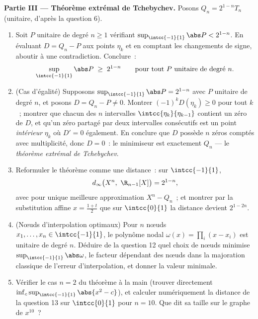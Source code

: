 \begin{problem}
\medskip
\noindent\textbf{Partie III --- Théorème extrémal de Tchebychev.}
Posons $Q_n = 2^{1-n}T_n$ (unitaire, d'après la question 6).
\begin{enumerate}[resume]
  \item Soit $P$ unitaire de degré $n \geq 1$ vérifiant $\sup_{\intcc{-1}{1}}\abs P < 2^{1-n}$. En évaluant $D
        = Q_n - P$ aux points $\eta_k$ et en comptant les
        changements de signe, aboutir à une contradiction. Conclure~:
        \[
        \sup_{\intcc{-1}{1}}\abs P \;\geq\; 2^{1-n}
        \qquad\text{pour tout } P \text{ unitaire de degré } n.
        \]
  \item (Cas d'égalité) Supposons $\sup_{\intcc{-1}{1}}\abs P =
        2^{1-n}$ avec $P$ unitaire de degré $n$, et posons $D = Q_n
        - P \neq 0$. Montrer $(-1)^kD(\eta_k) \geq 0$ pour tout $k$~;
        montrer que chacun des $n$ intervalles
        $\intcc{\eta_{k}}{\eta_{k-1}}$ contient un zéro de $D$,
        et qu'un zéro partagé par deux intervalles consécutifs est
        un point \emph{intérieur} $\eta_k$ où $D' = 0$ également. En
        conclure que $D$ possède $n$ zéros comptés avec
        multiplicité, donc $D = 0$~: le minimiseur est exactement
        $Q_n$ --- le \emph{théorème extrémal de Tchebychev}.
  \item Reformuler le théorème comme une distance~: sur $\intcc{-1}{1}$,
        \[
        d_\infty\bigl(X^n,\ \R_{n-1}[X]\bigr) = 2^{1-n},
        \]
        avec pour unique meilleure approximation $X^n - Q_n$~; et montrer
        par la substitution affine $x = \frac{1+t}2$ que sur
        $\intcc{0}{1}$ la distance devient $2^{1-2n}$.
  \item (Nœuds d'interpolation optimaux) Pour $n$ nœuds $x_1, \dots,
        x_n \in \intcc{-1}{1}$, le polynôme nodal
        $\omega(x) = \prod_i(x - x_i)$ est unitaire de degré $n$.
        Déduire de la question 12 quel choix de nœuds minimise
        $\sup_{\intcc{-1}{1}}\abs\omega$, le facteur dépendant des
        nœuds dans la majoration classique de l'erreur
        d'interpolation, et donner la valeur minimale.
  \item Vérifier le cas $n = 2$ du théorème à la main (trouver
        directement $\inf_c \sup_{\intcc{-1}{1}}\abs{x^2 - c}$),
        et calculer numériquement la distance de la question 13 sur
        $\intcc{0}{1}$ pour $n = 10$. Que dit sa taille
        sur le graphe de $x^{10}$~?
\end{enumerate}


\end{problem}
